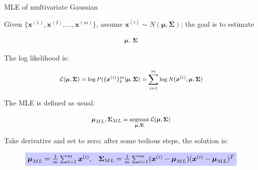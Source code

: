 \documentclass[11pt,ignorenonframetext,aspectratio=169]{beamer}
\newcommand{\argmax}{\operatornamewithlimits{argmax}}
\newcommand{\vv}[1]{\boldsymbol{#1}}
\newcommand{\Di}[2]{\ensuremath{ \vv{#1}^{(#2)}}}
\begin{document}
\begin{frame}{MLE of multivariate Gaussian}
\protect\hypertarget{mle-of-multivariate-gaussian}{}

Given \(\{\Di{x}{1}, \Di{x}{2}, \ldots, \Di{x}{m}\}\), assume
\(\Di{x}{i} \sim N(\vv{\mu},\vv{\Sigma})\); the goal is to estimate

\[\footnotesize \vv{\mu},\; \vv{\Sigma}\]

The log likelihood is:

\[\footnotesize \mathcal{L}(\vv{\mu}, \vv{\Sigma}) =  \log P(\{\Di{x}{i}\}_1^m|\vv{\mu}, \vv{\Sigma}) = \sum_{i=1}^m \log N(\Di{x}{i}; \vv{\mu}, \vv{\Sigma})\]

The MLE is defined as usual:

\[\footnotesize \vv{\mu}_{ML},\vv{\Sigma}_{ML} = \argmax_{\vv{\mu}, \vv{\Sigma}} \mathcal{L}(\vv{\mu}, \vv{\Sigma})\]

Take derivative and set to zero; after some tedious steps, the solution
is:

\begin{equation*}
\tikz[baseline]{  \node[fill=blue!20,anchor=base] (t1) {$\vv{\mu}_{ML} = \frac{1}{m} \sum_{i=1}^m \Di{x}{i},\;\;\; \vv{\Sigma}_{ML}= \frac{1}{m} \sum_{i=1}^m (\Di{x}{i}-\vv{\mu}_{ML})(\Di{x}{i}-\vv{\mu}_{ML})^T$};}
\end{equation*}

\end{frame}
\end{document}
